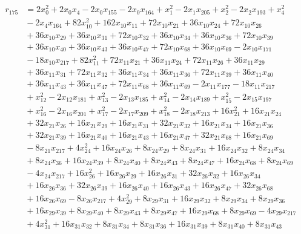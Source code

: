 \begin{align*}
r_{175} &={}2x_{0}^{2} +2x_{0}x_{4} -2x_{0}x_{155} -2x_{0}x_{164} +x_{1}^{2} -2x_{1}x_{205} +x_{2}^{2} -2x_{2}x_{193} +x_{4}^{2} \\
&{}-2x_{4}x_{164} +82x_{10}^{2} +162x_{10}x_{11} +72x_{10}x_{21} +36x_{10}x_{24} +72x_{10}x_{26} \\
&{}+36x_{10}x_{29} +36x_{10}x_{31} +72x_{10}x_{32} +36x_{10}x_{34} +36x_{10}x_{36} +72x_{10}x_{39} \\
&{}+36x_{10}x_{40} +36x_{10}x_{43} +36x_{10}x_{47} +72x_{10}x_{68} +36x_{10}x_{69} -2x_{10}x_{171} \\
&{}-18x_{10}x_{217} +82x_{11}^{2} +72x_{11}x_{21} +36x_{11}x_{24} +72x_{11}x_{26} +36x_{11}x_{29} \\
&{}+36x_{11}x_{31} +72x_{11}x_{32} +36x_{11}x_{34} +36x_{11}x_{36} +72x_{11}x_{39} +36x_{11}x_{40} \\
&{}+36x_{11}x_{43} +36x_{11}x_{47} +72x_{11}x_{68} +36x_{11}x_{69} -2x_{11}x_{177} -18x_{11}x_{217} \\
&{}+x_{12}^{2} -2x_{12}x_{181} +x_{13}^{2} -2x_{13}x_{185} +x_{14}^{2} -2x_{14}x_{189} +x_{15}^{2} -2x_{15}x_{197} \\
&{}+x_{16}^{2} -2x_{16}x_{201} +x_{17}^{2} -2x_{17}x_{209} +x_{18}^{2} -2x_{18}x_{213} +16x_{21}^{2} +16x_{21}x_{24} \\
&{}+32x_{21}x_{26} +16x_{21}x_{29} +16x_{21}x_{31} +32x_{21}x_{32} +16x_{21}x_{34} +16x_{21}x_{36} \\
&{}+32x_{21}x_{39} +16x_{21}x_{40} +16x_{21}x_{43} +16x_{21}x_{47} +32x_{21}x_{68} +16x_{21}x_{69} \\
&{}-8x_{21}x_{217} +4x_{24}^{2} +16x_{24}x_{26} +8x_{24}x_{29} +8x_{24}x_{31} +16x_{24}x_{32} +8x_{24}x_{34} \\
&{}+8x_{24}x_{36} +16x_{24}x_{39} +8x_{24}x_{40} +8x_{24}x_{43} +8x_{24}x_{47} +16x_{24}x_{68} +8x_{24}x_{69} \\
&{}-4x_{24}x_{217} +16x_{26}^{2} +16x_{26}x_{29} +16x_{26}x_{31} +32x_{26}x_{32} +16x_{26}x_{34} \\
&{}+16x_{26}x_{36} +32x_{26}x_{39} +16x_{26}x_{40} +16x_{26}x_{43} +16x_{26}x_{47} +32x_{26}x_{68} \\
&{}+16x_{26}x_{69} -8x_{26}x_{217} +4x_{29}^{2} +8x_{29}x_{31} +16x_{29}x_{32} +8x_{29}x_{34} +8x_{29}x_{36} \\
&{}+16x_{29}x_{39} +8x_{29}x_{40} +8x_{29}x_{43} +8x_{29}x_{47} +16x_{29}x_{68} +8x_{29}x_{69} -4x_{29}x_{217} \\
&{}+4x_{31}^{2} +16x_{31}x_{32} +8x_{31}x_{34} +8x_{31}x_{36} +16x_{31}x_{39} +8x_{31}x_{40} +8x_{31}x_{43} \\

\end{align*}
